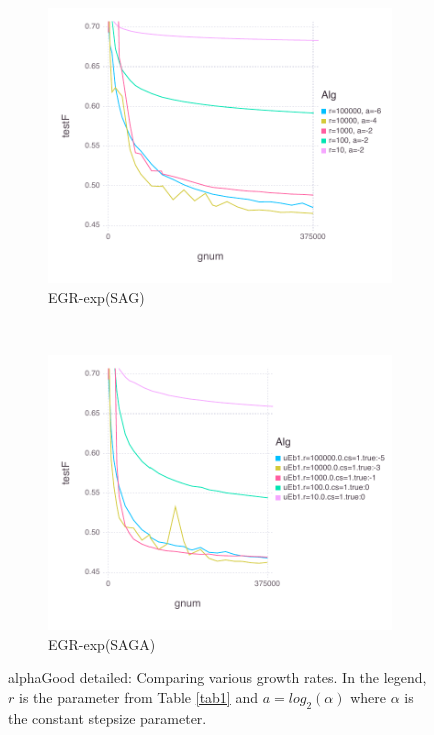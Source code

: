 \documentclass[11pt]{article}
\begin{document}
\begin{figure}[H]
          \begin{subfigure}[b]{0.45\textwidth}
              \includegraphics[width=\textwidth]{Figures/alphaGoodBLtrueffFinal-expfalse.pdf}
              \caption{EGR-exp(SAG)}
          \end{subfigure}
          ~ %
            \begin{subfigure}[b]{0.45\textwidth}
                \includegraphics[width=\textwidth]{Figures/alphaGoodBLtrueffFinal-exptrue.pdf}
                \caption{EGR-exp(SAGA)}
            \end{subfigure}
          \caption{alphaGood detailed: Comparing various growth rates. In the legend, $r$ is the parameter from Table \ref{tab1} and $a=log_2(\alpha)$ where $\alpha$ is the constant stepsize parameter.}\label{fig:alphaGood}
      \end{figure}
   
\end{document}
